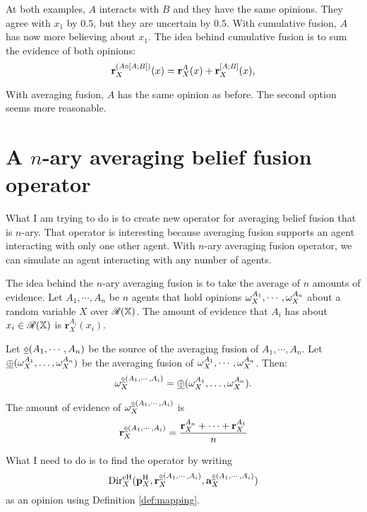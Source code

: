 \documentclass[a4paper,12pt]{article}
\theoremstyle{definition}
\theoremstyle{theorem}
\numberwithin{equation}{section}
\begin{document}
At both examples, $A$ interacts with $B$ and they have the same opinions. They agree with $x_1$ by $0.5$, but they are uncertain by $0.5$. With cumulative fusion, $A$ has now more believing about $x_1$. The idea behind cumulative fusion is to sum the evidence of both opinions:
\begin{equation}
\mathbf{r}^{(A \diamond [A; B])}_X(x) = \mathbf{r}^A_X(x) + \mathbf{r}^{[A; B]}_X(x) \text{,}
\end{equation}

With averaging fusion, $A$ has the same opinion as before. The second option seems more reasonable.


\section{A $n$-ary averaging belief fusion operator}

What I am trying to do is to create new operator for averaging belief fusion that is $n$-ary. That operator is interesting because averaging fusion supports an agent interacting with only one other agent. With $n$-ary averaging fusion operator, we can simulate an agent interacting with any number of agents.

The idea behind the $n$-ary averaging fusion is to take the average of $n$ amounts of evidence. Let $A_1, \cdots, A_n$ be $n$ agents that hold opinions $\omega^{A_1}_{X}, \cdots, \omega^{A_n}_{X}$ about a random variable $X$ over $\mathcal{R}(\mathbb{X})$. The amount of evidence that $A_i$ has about $x_i \in \mathcal{R}(\mathbb{X})$ is $\mathbf{r}^{A_i}_X(x_i)$.

Let $\underline{\diamond}(A_1, \cdots, A_n)$ be the source of the averaging fusion of $A_1, \cdots, A_n$. Let $\underline{\oplus}(\omega^{A_1}_{X}, \dots, \omega^{A_n}_{X})$ be the averaging fusion of $\omega^{A_1}_{X}, \cdots, \omega^{A_n}_{X}$. Then:
\begin{equation}
\omega^{\underline{\diamond}(A_1, \cdots, A_i)}_{X} = \underline{\oplus}(\omega^{A_1}_{X}, \dots, \omega^{A_n}_{X}) \text{.}
\end{equation}

The amount of evidence of $\omega^{\underline{\diamond}(A_1, \cdots, A_i)}_{X}$ is
\begin{equation}
\mathbf{r}^{\underline{\diamond}(A_1, \cdots, A_i)}_X = \dfrac{\mathbf{r}^{A_n}_X + \cdots + \mathbf{r}^{A_1}_X}{n} 
\end{equation}

What I need to do is to find the operator by writing
\begin{equation}
\mathrm{Dir}^{\mathrm{eH}}_X(\mathbf{p}^{\mathrm{H}}_X, \mathbf{r}^{\underline{\diamond}(A_1, \cdots, A_i)}_X, \mathbf{a}^{\underline{\diamond}(A_1, \cdots, A_i)}_{X})
\end{equation}
as an opinion using Definition \ref{def:mapping}.
\end{document}
